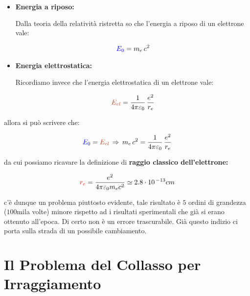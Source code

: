 \begin{itemize}
	\item \textbf{Energia a riposo:}
	
		Dalla teoria della relatività ristretta so che l'energia a riposo di un elettrone vale:
		
	\begin{align*}
		\textcolor{blue}{E_0} = m_e \, c^2
	\end{align*}
	
	\item \textbf{Energia elettrostatica:}
	
		Ricordiamo invece che l'energia elettrostatica di un elettrone vale:
	
	\begin{align*}
		\textcolor{Bittersweet}{E_{el}} = \frac{1}{4\pi\varepsilon_0} \, \frac{e^2}{r_e}
	\end{align*}
	
\end{itemize}
	
	allora si può scrivere che:
	
\begin{align*}
	\textcolor{blue}{E_0} = \textcolor{Bittersweet}{E_{el}} \, \Rightarrow \, m_e \, c^2 = \frac{1}{4\pi\varepsilon_0} \, \frac{e^2}{r_e}
\end{align*}

	da cui possiamo ricavare la definizione di \textbf{raggio classico dell'elettrone:}

\begin{mydef}
\begin{align*}
	\textcolor{red}{r_e} = \frac{e^2}{4\pi\varepsilon_0 m_e c^2} \simeq 2.8 \cdot 10^{\,-13} cm
\end{align*}
\end{mydef}

	c'è dunque un problema piuttosto evidente, tale risultato è $5$ ordini di grandezza ($100$mila volte) minore rispetto ad i risultati sperimentali che già si erano ottenuto all'epoca. Di certo non è un errore trascurabile. Già questo indizio ci porta sulla strada di un possibile cambiamento.
	
\section{Il Problema del Collasso per Irraggiamento}

